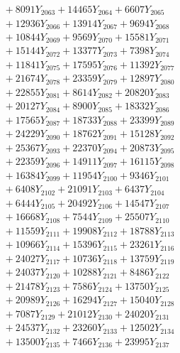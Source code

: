 \documentclass[a4paper,10pt]{article}
\begin{document}
{\begin{align}
&\;  + 8091 Y_{2063} + 14465 Y_{2064} + 6607 Y_{2065} \\[0.3ex]
&\;  + 12936 Y_{2066} + 13914 Y_{2067} + 9694 Y_{2068} \\[0.5ex]\allowbreak
&\;  + 10844 Y_{2069} + 9569 Y_{2070} + 15581 Y_{2071} \\[0.3ex]
&\;  + 15144 Y_{2072} + 13377 Y_{2073} + 7398 Y_{2074} \\[0.3ex]
&\;  + 11841 Y_{2075} + 17595 Y_{2076} + 11392 Y_{2077} \\[0.3ex]
&\;  + 21674 Y_{2078} + 23359 Y_{2079} + 12897 Y_{2080} \\[0.3ex]
&\;  + 22855 Y_{2081} + 8614 Y_{2082} + 20820 Y_{2083} \\[0.3ex]
&\;  + 20127 Y_{2084} + 8900 Y_{2085} + 18332 Y_{2086} \\[0.3ex]
&\;  + 17565 Y_{2087} + 18733 Y_{2088} + 23399 Y_{2089} \\[0.3ex]
&\;  + 24229 Y_{2090} + 18762 Y_{2091} + 15128 Y_{2092} \\[0.3ex]
&\;  + 25367 Y_{2093} + 22370 Y_{2094} + 20873 Y_{2095} \\[0.3ex]
&\;  + 22359 Y_{2096} + 14911 Y_{2097} + 16115 Y_{2098} \\[0.5ex]\allowbreak
&\;  + 16384 Y_{2099} + 11954 Y_{2100} + 9346 Y_{2101} \\[0.3ex]
&\;  + 6408 Y_{2102} + 21091 Y_{2103} + 6437 Y_{2104} \\[0.3ex]
&\;  + 6444 Y_{2105} + 20492 Y_{2106} + 14547 Y_{2107} \\[0.3ex]
&\;  + 16668 Y_{2108} + 7544 Y_{2109} + 25507 Y_{2110} \\[0.3ex]
&\;  + 11559 Y_{2111} + 19908 Y_{2112} + 18788 Y_{2113} \\[0.3ex]
&\;  + 10966 Y_{2114} + 15396 Y_{2115} + 23261 Y_{2116} \\[0.3ex]
&\;  + 24027 Y_{2117} + 10736 Y_{2118} + 13759 Y_{2119} \\[0.3ex]
&\;  + 24037 Y_{2120} + 10288 Y_{2121} + 8486 Y_{2122} \\[0.3ex]
&\;  + 21478 Y_{2123} + 7586 Y_{2124} + 13750 Y_{2125} \\[0.3ex]
&\;  + 20989 Y_{2126} + 16294 Y_{2127} + 15040 Y_{2128} \\[0.5ex]\allowbreak
&\;  + 7087 Y_{2129} + 21012 Y_{2130} + 24020 Y_{2131} \\[0.3ex]
&\;  + 24537 Y_{2132} + 23260 Y_{2133} + 12502 Y_{2134} \\[0.3ex]
&\;  + 13500 Y_{2135} + 7466 Y_{2136} + 23995 Y_{2137} \\[0.3ex]

\end{align}}
\end{document}
